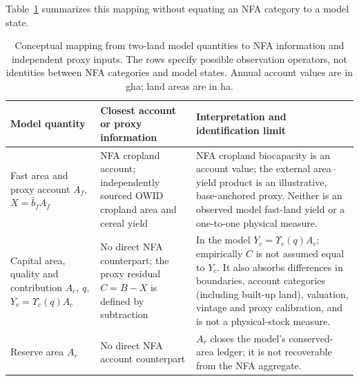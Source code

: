 \documentclass[11pt,a4paper]{article}
\newcommand{\Ups}{\Upsilon_c}
\begin{document}
Table~\ref{tab:si_model_nfa} summarizes this mapping without equating an NFA category to a model state.

\begin{table}[htbp]
\centering\small
\caption{Conceptual mapping from two-land model quantities to NFA information and independent proxy inputs. The rows specify possible observation operators, not identities between NFA categories and model states. Annual account values are in gha; land areas are in ha.}
\label{tab:si_model_nfa}
\begin{tabularx}{\textwidth}{>{\raggedright\arraybackslash}p{} >{\raggedright\arraybackslash}p{} X}
\toprule
Model quantity & Closest account or proxy information & Interpretation and identification limit \\
\midrule
Fast area and proxy account $A_f$, $X=\hat b_fA_f$ & NFA cropland account; independently sourced OWID cropland area and cereal yield & NFA cropland biocapacity is an account value; the external area--yield product is an illustrative, base-anchored proxy. Neither is an observed model fast-land yield or a one-to-one physical measure. \\
Capital area, quality and contribution $A_c$, $q$, $Y_c=\Ups(q)A_c$ & No direct NFA counterpart; the proxy residual $C=B-X$ is defined by subtraction & In the model $Y_c=\Ups(q)A_c$; empirically $C$ is not assumed equal to $Y_c$. It also absorbs differences in boundaries, account categories (including built-up land), valuation, vintage and proxy calibration, and is not a physical-stock measure. \\
Reserve area $A_r$ & No direct NFA account counterpart & $A_r$ closes the model's conserved-area ledger; it is not recoverable from the NFA aggregate. \\
\bottomrule
\end{tabularx}
\end{table}
\end{document}
